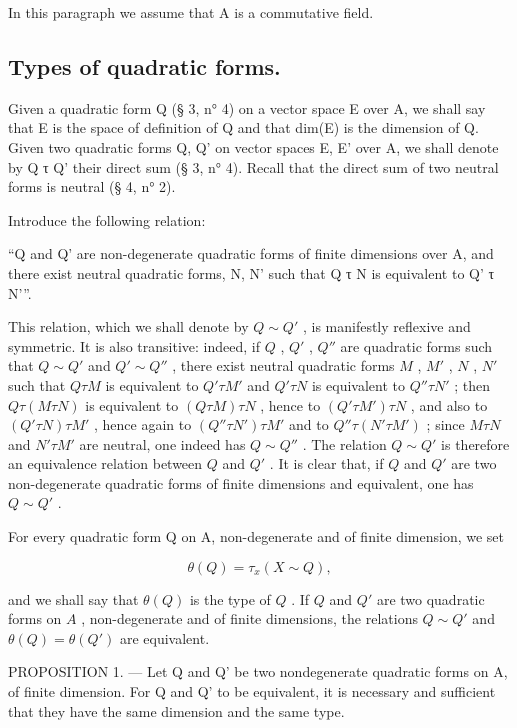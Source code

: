 In this paragraph we assume that A is a commutative field.

\subsection{Types of quadratic forms.}

Given a quadratic form Q (§ 3, n° 4) on a vector space E over A, we shall say that E is the space of definition of Q and that dim(E) is the dimension of Q. Given two quadratic forms Q, Q' on vector spaces E, E' over A, we shall denote by Q τ Q' their direct sum (§ 3, n° 4). Recall that the direct sum of two neutral forms is neutral (§ 4, n° 2).

Introduce the following relation:

“Q and Q' are non-degenerate quadratic forms of finite dimensions over A, and there exist neutral quadratic forms, N, N' such that Q τ N is equivalent to Q' τ N'”.

This relation, which we shall denote by \(Q \sim Q'\) , is manifestly reflexive and symmetric. It is also transitive: indeed, if \(Q\) , \(Q'\) , \(Q''\) are quadratic forms such that \(Q \sim Q'\) and \(Q' \sim Q''\) , there exist neutral quadratic forms \(M\) , \(M'\) , \(N\) , \(N'\) such that \(Q \tau M\) is equivalent to \(Q' \tau M'\) and \(Q' \tau N\) is equivalent to \(Q'' \tau N'\) ; then \(Q \tau (M \tau N)\) is equivalent to \((Q \tau M) \tau N\) , hence to \((Q' \tau M') \tau N\) , and also to \((Q' \tau N) \tau M'\) , hence again to \((Q'' \tau N') \tau M'\) and to \(Q'' \tau (N' \tau M')\) ; since \(M \tau N\) and \(N' \tau M'\) are neutral, one indeed has \(Q \sim Q''\) . The relation \(Q \sim Q'\) is therefore an equivalence relation between \(Q\) and \(Q'\) . It is clear that, if \(Q\) and \(Q'\) are two non-degenerate quadratic forms of finite dimensions and equivalent, one has \(Q \sim Q'\) .

For every quadratic form Q on A, non-degenerate and of finite dimension, we set

\[
\theta (Q) = \tau_ {x} (X \sim Q),\tag{1}
\]

and we shall say that \(\theta(Q)\) is the type of \(Q\) . If \(Q\) and \(Q'\) are two quadratic forms on \(A\) , non-degenerate and of finite dimensions, the relations \(Q \sim Q'\) and \(\theta(Q) = \theta(Q')\) are equivalent.

PROPOSITION 1. --- Let Q and Q' be two nondegenerate quadratic forms on A, of finite dimension. For Q and Q' to be equivalent, it is necessary and sufficient that they have the same dimension and the same type.

